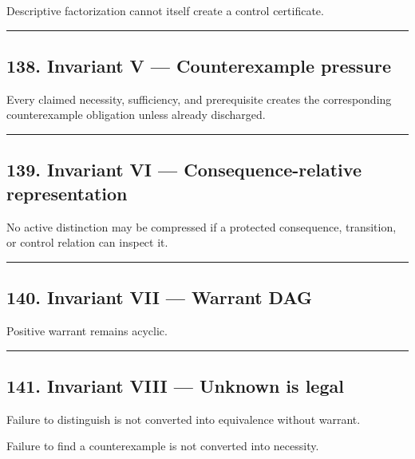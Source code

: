 \documentclass[
]{article}
\begin{document}
Descriptive factorization cannot itself create a control certificate.

\begin{center}\rule{0.5\linewidth}{0.5pt}\end{center}

\subsection{138. Invariant V --- Counterexample
pressure}\label{invariant-v-counterexample-pressure}

Every claimed necessity, sufficiency, and prerequisite creates the
corresponding counterexample obligation unless already discharged.

\begin{center}\rule{0.5\linewidth}{0.5pt}\end{center}

\subsection{139. Invariant VI --- Consequence-relative
representation}\label{invariant-vi-consequence-relative-representation}

No active distinction may be compressed if a protected consequence,
transition, or control relation can inspect it.

\begin{center}\rule{0.5\linewidth}{0.5pt}\end{center}

\subsection{140. Invariant VII --- Warrant
DAG}\label{invariant-vii-warrant-dag}

Positive warrant remains acyclic.

\begin{center}\rule{0.5\linewidth}{0.5pt}\end{center}

\subsection{141. Invariant VIII --- Unknown is
legal}\label{invariant-viii-unknown-is-legal}

Failure to distinguish is not converted into equivalence without
warrant.

Failure to find a counterexample is not converted into necessity.
\end{document}
